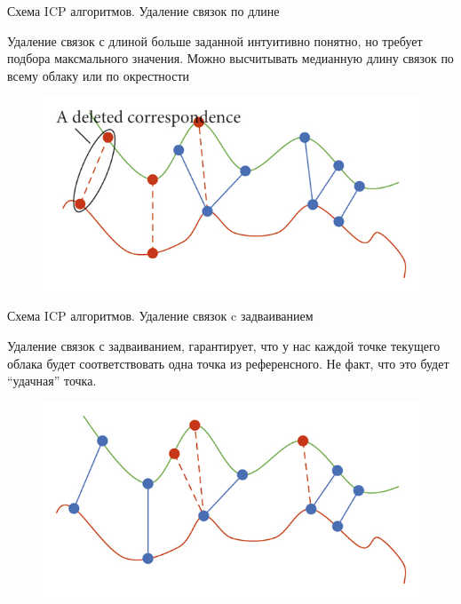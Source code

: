 \documentclass[6pt,pdf,utf8,russian]{beamer}
\begin{document}
\begin{frame}[fragile]{Схема ICP алгоритмов. Удаление связок по длине}
    \begin{block}{}
        Удаление связок с длиной больше заданной интуитивно понятно, но требует подбора
        максмального значения. Можно высчитывать медианную длину связок по всему облаку
        или по окрестности
    \end{block}

    \pause

    \begin{block}{}
        \begin{figure}
            \includegraphics[]{images/correspondence_erasure_2.jpg}
        \end{figure}
    \end{block}

\end{frame}

\begin{frame}[fragile]{Схема ICP алгоритмов. Удаление связок c задваиванием}
    \begin{block}{}
        Удаление связок с задваиванием, гарантирует, что у нас каждой точке текущего облака будет
        соответствовать одна точка из референсного. Не факт, что это будет ``удачная'' точка.
    \end{block}

    \pause

    \begin{block}{}
        \begin{figure}
            \includegraphics[]{images/correspondence_erasure_3.jpg}
        \end{figure}
    \end{block}

\end{frame}
\end{document}
